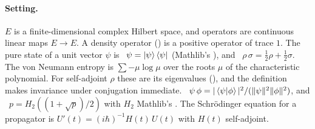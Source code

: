 \documentclass[11pt]{article}
\begin{document}
\paragraph{Setting.} $E$ is a finite-dimensional complex Hilbert space, and operators are
continuous linear maps $E \to E$. A density operator () is a positive operator of
trace $1$. The pure state of a unit vector $\psi$ is ~$\psi = \ket{\psi}\bra{\psi}$
(Mathlib's ), and ~$\rho\,\sigma = \tfrac12\rho + \tfrac12\sigma$. The
von Neumann entropy  is $\sum -\mu \log \mu$ over the roots $\mu$ of the
characteristic polynomial. For self-adjoint $\rho$ these are its eigenvalues
(), and the definition makes invariance under conjugation immediate.
~$\psi\,\phi = |\braket{\psi|\phi}|^2/(\|\psi\|^2\|\phi\|^2)$, and
~$p = H_2((1+\sqrt p)/2)$ with $H_2$ Mathlib's . The
Schr\"odinger equation for a propagator is $U'(t) = (i\hbar)^{-1} H(t)\,U(t)$ with $H(t)$
self-adjoint.
\end{document}
